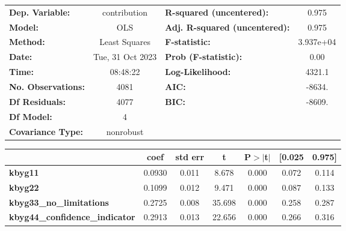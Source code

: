 \begin{center}
\begin{tabular}{lclc}
\toprule
\textbf{Dep. Variable:}                &   contribution   & \textbf{  R-squared (uncentered):}      &     0.975   \\
\textbf{Model:}                        &       OLS        & \textbf{  Adj. R-squared (uncentered):} &     0.975   \\
\textbf{Method:}                       &  Least Squares   & \textbf{  F-statistic:       }          & 3.937e+04   \\
\textbf{Date:}                         & Tue, 31 Oct 2023 & \textbf{  Prob (F-statistic):}          &     0.00    \\
\textbf{Time:}                         &     08:48:22     & \textbf{  Log-Likelihood:    }          &    4321.1   \\
\textbf{No. Observations:}             &        4081      & \textbf{  AIC:               }          &    -8634.   \\
\textbf{Df Residuals:}                 &        4077      & \textbf{  BIC:               }          &    -8609.   \\
\textbf{Df Model:}                     &           4      & \textbf{                     }          &             \\
\textbf{Covariance Type:}              &    nonrobust     & \textbf{                     }          &             \\
\bottomrule
\end{tabular}
\begin{tabular}{lcccccc}
                                       & \textbf{coef} & \textbf{std err} & \textbf{t} & \textbf{P$> |$t$|$} & \textbf{[0.025} & \textbf{0.975]}  \\
\midrule
\textbf{kbyg11}                        &       0.0930  &        0.011     &     8.678  &         0.000        &        0.072    &        0.114     \\
\textbf{kbyg22}                        &       0.1099  &        0.012     &     9.471  &         0.000        &        0.087    &        0.133     \\
\textbf{kbyg33\_no\_limitations}       &       0.2725  &        0.008     &    35.698  &         0.000        &        0.258    &        0.287     \\
\textbf{kbyg44\_confidence\_indicator} &       0.2913  &        0.013     &    22.656  &         0.000        &        0.266    &        0.316     \\

\end{tabular}
\end{center}
